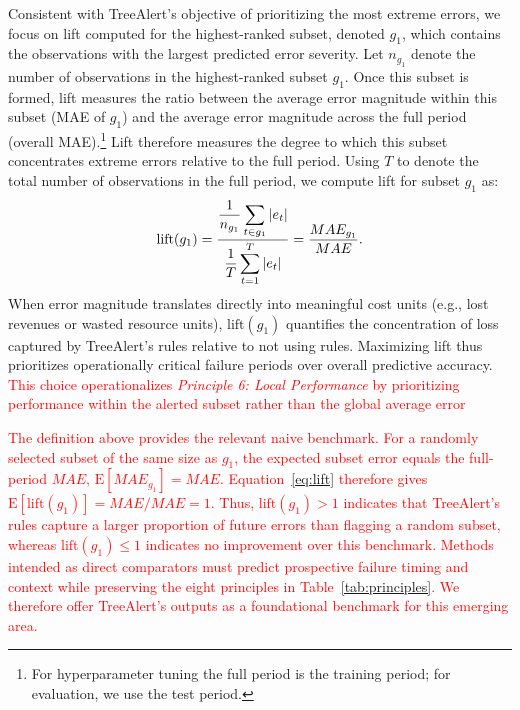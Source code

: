 \documentclass[]{interact}
\newcommand{\matt}[1]{\textcolor{red}{#1}}
\theoremstyle{definition}
\begin{document}
Consistent with TreeAlert’s objective of prioritizing the most extreme errors, we focus on lift computed for the highest-ranked subset, denoted \( g_{1} \), which contains the observations with the largest predicted error severity. Let \( n_{g_1} \) denote the number of observations in the highest-ranked subset \( g_{1} \). Once this subset is formed, lift measures the ratio between the average error magnitude within this subset (MAE of $g_1$) and the average  error magnitude across the full %
period (overall MAE).\footnote{For hyperparameter tuning the full period is the training period; for evaluation, we use the test period.} Lift therefore measures the degree to which this subset concentrates extreme errors relative to the full %
period. Using \( T \) to denote the total number of observations in the full %
period, we compute lift for subset \( g_{1} \) as:
\begin{equation}
\label{eq:lift}
\text{lift}(g_{1}) =
\frac{
\displaystyle \frac{1}{n_{g_1}}\sum_{t\in {g_1}} |e_t|
}{
\displaystyle \frac{1}{T}\sum_{t=1}^{T} |e_t|
} = \frac{MAE_{g_1}}{MAE}.
\end{equation}
When error magnitude translates directly into meaningful cost units (e.g., lost revenues or wasted resource units), $\text{lift}(g_1)$ quantifies the concentration of loss captured by TreeAlert's rules relative to not using rules. Maximizing lift thus prioritizes operationally critical failure periods over overall predictive
accuracy. \matt{This choice operationalizes \emph{Principle 6: Local Performance} by prioritizing performance within the alerted subset rather than the global average error} %

\matt{The definition above provides the relevant naive benchmark. For a randomly selected subset of the same size as $g_1$, the expected subset error equals the full-period $MAE$, $\mathrm{E}[MAE_{g_1}]=MAE$. Equation~\eqref{eq:lift} therefore gives $\mathrm{E}[\mathrm{lift}(g_1)]=MAE/MAE=1$. Thus, $\mathrm{lift}(g_1)>1$ indicates that TreeAlert's rules capture a larger proportion of future errors than flagging a random subset, whereas $\mathrm{lift}(g_1)\leq1$ indicates no improvement over this benchmark. Methods intended as direct comparators must predict prospective failure timing and context while preserving the eight principles in Table~\ref{tab:principles}. We therefore offer TreeAlert's outputs as a foundational benchmark for this emerging area.}
\end{document}
